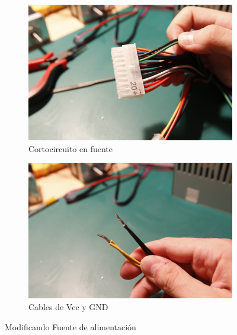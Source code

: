 			\begin{figure}[H]
			        \centering
			        \begin{subfigure}[htb]{0.4\textwidth}
			                \centering
			                \includegraphics[width=\textwidth]{../../Fotos/20.jpg}
			                \caption{Cortocircuito en fuente }
			                \label{fig:atx.fuente}
			        \end{subfigure}
			        \begin{subfigure}[htb]{0.4\textwidth}
			                \centering
			                \includegraphics[width=\textwidth]{../../Fotos/21.jpg}
			                \caption{Cables de Vcc y GND}
			                \label{fig:vcc.fuente}
			        \end{subfigure}
			        \caption{Modificando Fuente de alimentación}\label{fig:fuente.alimentación}
			\end{figure}
